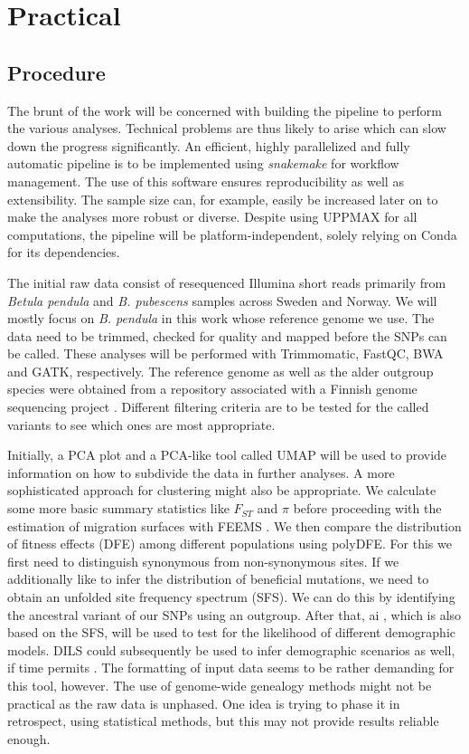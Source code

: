\documentclass[11pt]{article}
\begin{document}
\section{Practical}

\subsection{Procedure}

The brunt of the work will be  concerned with building the pipeline to perform the various analyses. Technical problems are thus likely to arise which can slow down the progress significantly. An efficient, highly parallelized and fully automatic pipeline is to be implemented using \textit{snakemake} for workflow management. The use of this software ensures reproducibility as well as extensibility. The sample size can, for example, easily be increased later on to make the analyses more robust or diverse. Despite using UPPMAX for all computations, the pipeline will be platform-independent, solely relying on Conda for its dependencies.

The initial raw data consist of resequenced Illumina short reads primarily from \textit{Betula pendula} and \textit{B. pubescens} samples across Sweden and Norway. We will mostly focus on \textit{B. pendula} in this work whose reference genome we use. The data need to be trimmed, checked for quality and mapped before the SNPs can be called. These analyses will be performed with Trimmomatic, FastQC, BWA and GATK, respectively. The reference genome as well as the alder outgroup species were obtained from a repository associated with a Finnish genome sequencing project \cite{jarkko}. Different filtering criteria are to be tested for the called variants to see which ones are most appropriate.

Initially, a PCA plot and a PCA-like tool called UMAP \cite{umap} will be used to provide information on how to subdivide the data in further analyses. A more sophisticated approach for clustering might also be appropriate. We calculate some more basic summary statistics like $F_{ST}$ and $\pi$ before proceeding with the estimation of migration surfaces with FEEMS \cite{feems}. We then compare the distribution of fitness effects (DFE) among different populations using polyDFE. For this we first need to distinguish synonymous from non-synonymous sites. If we additionally like to infer the distribution of beneficial mutations, we need to obtain an unfolded site frequency spectrum (SFS). We can do this by identifying the ancestral variant of our SNPs using an outgroup. After that, \textdelta a\textdelta i \cite{dadi}, which is also based on the SFS, will be used to test for the likelihood of different demographic models. DILS could subsequently be used to infer demographic scenarios as well, if time permits \cite{dils}. The formatting of input data seems to be rather demanding for this tool, however. The use of genome-wide genealogy methods might not be practical as the raw data is unphased. One idea is trying to phase it in retrospect, using statistical methods, but this may not provide results reliable enough.
\end{document}
